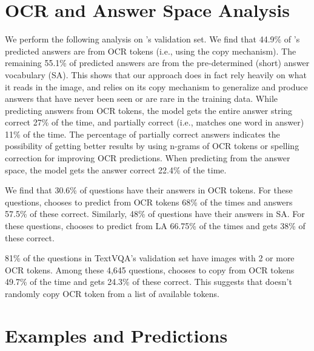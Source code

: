 \documentclass[10pt,twocolumn,letterpaper]{article}
\begin{document}
\section{OCR and Answer Space Analysis}
\label{appendx:analysis}
We perform the following analysis on \datasetName's validation set. We find that 44.9\% of \approachNameShort's predicted answers are from OCR tokens (i.e., using the copy mechanism). The remaining 55.1\% of predicted answers are from the pre-determined (short) answer vocabulary (SA). This shows that our approach does in fact rely heavily on what it reads in the image, and relies on its copy mechanism to generalize and produce answers that have never been seen or are rare in the training data.
While predicting answers from OCR tokens, the model gets the entire answer string correct 27\% of the time, and partially correct (i.e., matches one word in answer) 11\% of the time. The percentage of partially correct answers indicates the possibility of getting better results by using n-grams of OCR tokens or spelling correction for improving OCR predictions. 
When predicting from the answer space, the model gets the answer correct 22.4\% of the time. 

We find that 30.6\% of questions have their answers in OCR tokens. For these questions, \approachNameShort chooses to predict from OCR tokens 68\% of the times and answers 57.5\% of these correct. Similarly, 48\% of questions have their answers in SA. For these questions, \approachNameShort chooses to predict from LA 66.75\%  of the times and gets 38\% of these correct.

81\% of the questions in TextVQA's validation set have images with 2 or more OCR tokens. Among these 4,645 questions, \approachNameShort chooses to copy from OCR tokens 49.7\% of the time and gets 24.3\% of these correct. This suggests that \approachNameShort doesn't randomly copy OCR token from a list of available tokens.

\section{\datasetName Examples and \approachNameShort Predictions}
\end{document}
